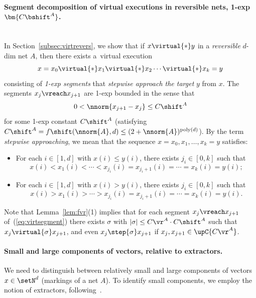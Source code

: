 \paragraph{Segment decomposition of virtual executions in reversible nets,
1-exp $\bm{C\bshift^A}$.}
\ \\
In Section~\ref{subsec:virtrevers}, 
we show that
if $x\virtual{*}y$ in a \emph{reversible} $d$-dim net $A$, then
there exists
a~virtual execution 
\begin{equation}\label{eq:virtsegment}
x=x_0\virtual{*}x_1\virtual{*}x_2\cdots\virtual{*}x_k=y
\end{equation}
consisting of \emph{1-exp segments} 
that \emph{stepwise approach the
target} $y$ from $x$.
The segments $x_j\vreach x_{j+1}$ are 1-exp bounded in the sense that
\begin{equation}\label{eq:Cshift}
0<\nnorm{x_{j+1}-x_j}\leq C\shift^A
\end{equation}
for some 1-exp constant $C\shift^A$ (satisfying
$C\shift^A=f\shift(\nnorm{A},d)\leq
(2+\nnorm{A})^{\text{poly}(d)}$).
By the term \emph{stepwise approaching},
	we mean that the sequence $x = x_0, x_1, \dots, x_k = y$ satisfies:
\begin{itemize}
    \item For each $i \in [1, d]$ with $x(i) \leq y(i)$, there exists
	    $j_i\in [0,k]$ such that
		\[ x(i) < x_1(i) < \cdots < x_{j_i}(i) = x_{{j_i}+1}(i) = \cdots = x_k(i)
		= y(i); \]
    \item For each $i \in [1, d]$ with $x(i) > y(i)$,  there exists
	    $j_i\in [0,k]$ such that
		\[ x(i) > x_1(i) > \cdots > x_{j_i}(i) = x_{{j_i}+1}(i) = \cdots = x_k(i)
		= y(i). \]
\end{itemize}

\noindent
Note that Lemma~\ref{lem:fvr}(1) implies that for each segment $x_j\vreach x_{j+1}$
of~(\ref{eq:virtsegment}) there exists  $\sigma$ with
$|\sigma|\leq C\vr^A\cdot C\shift^A$ such that
$x_j\virtual{\sigma}x_{j+1}$,
and even $x_j\step{\sigma}x_{j+1}$ if $x_j,x_{j+1}\in\upC{C\vr^A}$.


\paragraph{Small and large components of vectors, relative to
extractors.}
We need to distinguish between relatively small and large components 
of vectors $x \in \setN^d$ (markings of a net $A$). 
To identify small components, we employ the notion of 
extractors, following~\cite{DBLP:conf/fsttcs/Leroux19}.



